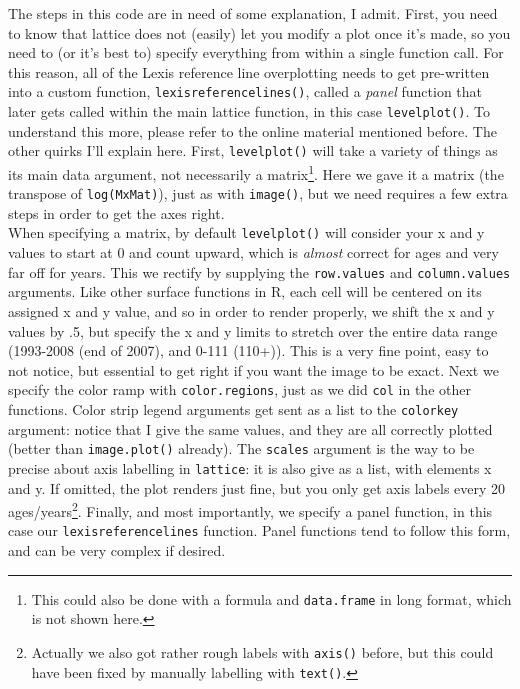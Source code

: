 \documentclass[a4paper]{article}
\begin{document}
The steps in this code are in need of some explanation, I admit. First, you need to know that lattice does not (easily) let you modify a plot once it's made, so you need to (or it's best to) specify everything from within a single function call. For this reason, all of the Lexis reference line overplotting needs to get pre-written into a custom function, \texttt{lexisreferencelines()}, called a \textit{panel} function that later gets called within the main lattice function, in this case \texttt{levelplot()}. To understand this more, please refer to the online material mentioned before. The other quirks I'll explain here. First, \texttt{levelplot()} will take a variety of things as its main data argument, not necessarily a matrix\footnote{This could also be done with a formula and \texttt{data.frame} in long format, which is not shown here.}. Here we gave it a matrix (the transpose of \texttt{log(MxMat)}), just as with \texttt{image()}, but we need requires a few extra steps in order to get the axes right.\\

When specifying a matrix, by default \texttt{levelplot()} will consider your x and y values to start at 0 and count upward, which is \textit{almost} correct for ages and very far off for years. This we rectify by supplying the \texttt{row.values} and \texttt{column.values} arguments. Like other surface functions in R, each cell will be centered on its assigned x and y value, and so in order to render properly, we shift the x and y values by .5, but specify the x and y limits to stretch over the entire data range (1993-2008 (end of 2007), and 0-111 (110+)). This is a very fine point, easy to not notice, but essential to get right if you want the image to be exact. Next we specify the color ramp with \texttt{color.regions}, just as we did \texttt{col} in the other functions. Color strip legend arguments get sent as a list to the \texttt{colorkey} argument: notice that I give the same values, and they are all correctly plotted (better than \texttt{image.plot()} already). The \texttt{scales} argument is the way to be precise about axis labelling in \texttt{lattice}: it is also give as a list, with elements x and y. If omitted, the plot renders just fine, but you only get axis labels every 20 ages/years\footnote{Actually we also got rather rough labels with \texttt{axis()} before, but this could have been fixed by manually labelling with \texttt{text()}.}. Finally, and most importantly, we specify a panel function, in this case our \texttt{lexisreferencelines} function. Panel functions tend to follow this form, and can be very complex if desired.
\end{document}
